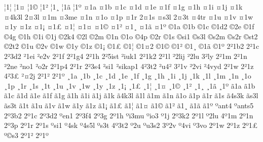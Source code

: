 {^^a61^^a6
^^a61^^a4
^^a61^^a9
^^a61^^b2
^^a61^^b8
^^a61^^e3
^^a61^^ba
^^a41a
^^a41b
^^a41c
^^a41d
^^a41e
^^a41f
^^a41g
^^a41h
^^a41i
^^a41j
^^a41k
^^a44k3l
2^^a43l
^^a41m
^^a43me
^^a41n
^^a41o
^^a41p
^^a41r
2^^a41s
^^a4s3l
2^^a43t
^^a44tr
^^a41u
^^a41v
^^a41w
^^a41y
^^a41z
^^a41^^a1
^^a41^^a3
^^a41^^a6
^^a41^^a4
^^a41^^a9
^^a41^^b2
^^a41^^b8
^^a41^^e3
^^a41^^ba
^^a91a
^^a91b
^^a91c
^^a91d2
^^a92e
^^a91f
^^a94g
^^a91h
^^a91i
^^a91j
^^a92k4
^^a92l
^^a92m
^^a91n
^^a91o
^^a94p
^^a92r
^^a91s
^^a9si1
^^a9s3l
^^a9s2m
^^a9s2r
^^a9st2
^^a92t2
^^a91u
^^a92v
^^a91w
^^a91y
^^a91z
^^a91^^a1
^^a91^^a3
^^a91^^a6
^^a91^^a42
^^a91^^a9
^^a91^^b2
^^a91^^b8
^^a91^^e3
^^a91^^ba
2^^b21b2
2^^b21c
2^^b23d2
^^b21ei
^^b2e2v
2^^b21f
2^^b21g4
2^^b21h
2^^b25ist
^^b2iuk1
2^^b21k2
2^^b21l
^^b22lij
^^b22lu
3^^b2ly
2^^b21m
2^^b21n
^^b22ne
^^b2no1
^^b2o2r
2^^b21p4
2^^b21r
2^^b23s4
^^b2si1
^^b2sikap1
4^^b23t2
^^b2u4^^b2
3^^b21v
^^b22vi
^^b24vyd
2^^b21w
2^^b21z
4^^b23^^a3
^^b2^^a42j
2^^b21^^b2
2^^b21^^ba
^^b81a
^^b81b
^^b81c
^^b81d
^^b81e
^^b81f
^^b81g
^^b81h
^^b81i
^^b81j
^^b81k
^^b81l
^^b81m
^^b81n
^^b81o
^^b81p
^^b81r
^^b81s
^^b81t
^^b81u
^^b81v
^^b81w
^^b81y
^^b81z
^^b81^^a1
^^b81^^a3
^^b81^^a6
^^b81^^a4
^^b81^^a9
^^b81^^b2
^^b81^^b8
^^b81^^e3
^^b81^^ba
^^e31a
^^e31b
^^e31c
^^e31d
^^e31e
^^e31f
^^e31g
^^e31h
^^e31i
^^e31j
^^e31k
^^e34k3l
^^e31l
^^e31m
^^e31n
^^e31o
^^e31p
^^e31r
^^e31s
^^e34s3k
^^e3s3l
^^e3s3t
^^e31t
^^e31u
^^e31v
^^e31w
^^e31y
^^e31z
^^e31^^a1
^^e31^^a3
^^e31^^a6
^^e31^^a4
^^e31^^a9
^^e31^^b2
^^e31^^b8
^^e31^^e3
^^e31^^ba
^^baant4
^^baants5
2^^ba3b2
2^^ba1c
2^^ba3d2
^^baen1
2^^ba3f4
2^^ba3g
2^^ba1h
^^bai3mu
^^baio3
^^ba1j
2^^ba3k2
2^^ba1l
^^ba2lu
4^^ba1m
2^^ba1n
2^^ba3p
2^^ba1r
2^^ba1s
^^basi1
^^ba4sk
^^ba4s5l
^^bas3t
4^^ba3t2
^^ba2u
^^bau3s2
3^^ba2v
^^ba4vi
^^ba3vo
2^^ba1w
2^^ba1z
2^^ba1^^a3
^^ba^^a9s3
2^^ba1^^b2
2^^ba1^^ba
}
